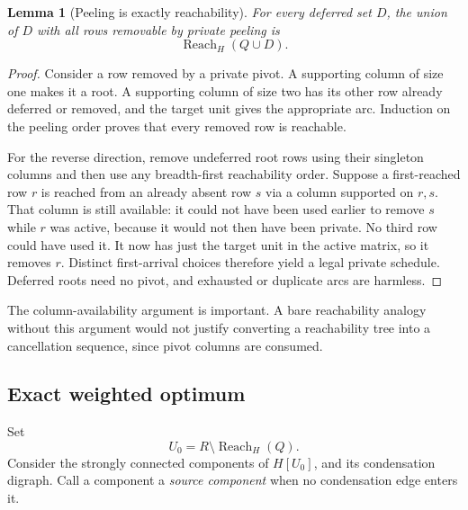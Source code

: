 \documentclass[11pt]{article}
\newtheorem{lemma}[theorem]{Lemma}
\theoremstyle{definition}\newtheorem{definition}[theorem]{Definition}
\theoremstyle{remark}\newtheorem{remark}[theorem]{Remark}
\newcommand{\Reach}{\operatorname{Reach}}
\begin{document}
\begin{lemma}[Peeling is exactly reachability]
\label{lem:reach}
For every deferred set $D$, the union of $D$ with all rows removable by private peeling is
\[
 \Reach_H(Q\cup D).
\]
\end{lemma}
\begin{proof}
Consider a row removed by a private pivot. A supporting column of size one makes it a root. A supporting column of size two has its other row already deferred or removed, and the target unit gives the appropriate arc. Induction on the peeling order proves that every removed row is reachable.

For the reverse direction, remove undeferred root rows using their singleton columns and then use any breadth-first reachability order. Suppose a first-reached row $r$ is reached from an already absent row $s$ via a column supported on $r,s$. That column is still available: it could not have been used earlier to remove $s$ while $r$ was active, because it would not then have been private. No third row could have used it. It now has just the target unit in the active matrix, so it removes $r$. Distinct first-arrival choices therefore yield a legal private schedule. Deferred roots need no pivot, and exhausted or duplicate arcs are harmless.
\end{proof}

The column-availability argument is important. A bare reachability analogy without this argument would not justify converting a reachability tree into a cancellation sequence, since pivot columns are consumed.

\subsection{Exact weighted optimum}
Set
\[
 U_0=R\setminus\Reach_H(Q).
\]
Consider the strongly connected components of $H[U_0]$, and its condensation digraph. Call a component a \emph{source component} when no condensation edge enters it.
\end{document}
